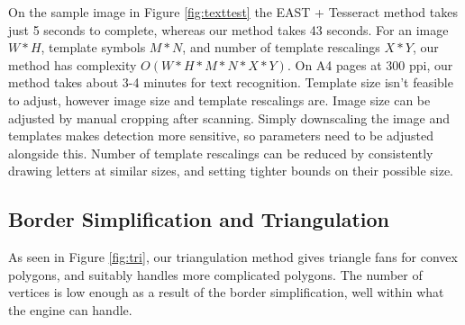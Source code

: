 \documentclass[conference]{IEEEtran}
\begin{document}
On the sample image in Figure \ref{fig:texttest} the EAST + Tesseract method takes just 5 seconds to complete, whereas our method takes 43 seconds. For an image $W*H$, template symbols $M*N$, and number of template rescalings $X*Y$, our method has complexity $O(W*H*M*N*X*Y)$. On A4 pages at 300 ppi, our method takes about 3-4 minutes for text recognition. Template size isn't feasible to adjust, however image size and template rescalings are. Image size can be adjusted by manual cropping after scanning. Simply downscaling the image and templates makes detection more sensitive, so parameters need to be adjusted alongside this. Number of template rescalings can be reduced by consistently drawing letters at similar sizes, and setting tighter bounds on their possible size.

\subsection{Border Simplification and Triangulation}

As seen in Figure \ref{fig:tri}, our triangulation method gives triangle fans for convex polygons, and suitably handles more complicated polygons. The number of vertices is low enough as a result of the border simplification, well within what the engine can handle.
\end{document}
